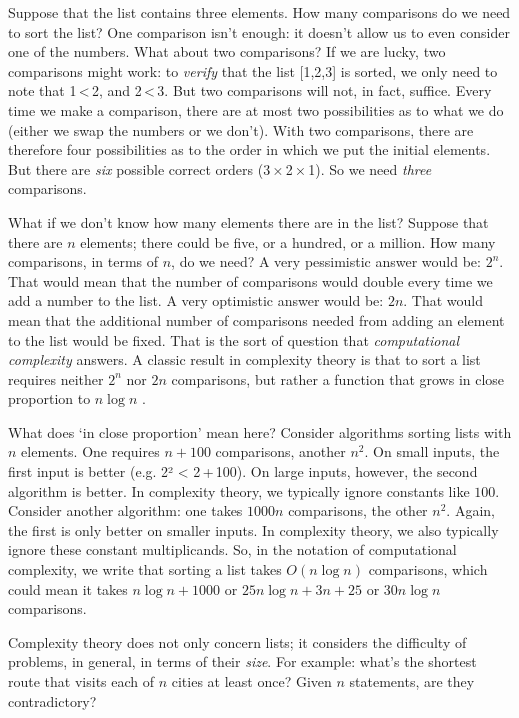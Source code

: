 Suppose that the list contains three elements. How many comparisons do we need to sort the list? One comparison isn’t enough: it doesn’t allow us to even consider one of the numbers. What about two comparisons? If we are lucky, two comparisons might work: to \emph{verify} that the list [1,2,3] is sorted, we only need to note that 1 < 2, and 2 < 3. But two comparisons will not, in fact, suffice. Every time we make a comparison, there are at most two possibilities as to what we do (either we swap the numbers or we don’t). With two comparisons, there are therefore four possibilities as to the order in which we put the initial elements. But there are \emph{six} possible correct orders (3 × 2 × 1). So we need \emph{three} comparisons.

What if we don’t know how many elements there are in the list? Suppose that there are \(n\) elements; there could be five, or a hundred, or a million. How many comparisons, in terms of \(n\), do we need? A very pessimistic answer would be: \(2^n\). That would mean that the number of comparisons would double every time we add a number to the list. A very optimistic answer would be: \(2n\). That would mean that the additional number of comparisons needed from adding an element to the list would be fixed. That is the sort of question that \emph{computational complexity} answers. A classic result in complexity theory is that to sort a list requires neither \(2^n\) nor \(2n\) comparisons, but rather a function that grows in close proportion to \(n \log n\) \parencite{hoare1962}.

What does ‘in close proportion’ mean here? Consider algorithms sorting lists with \(n\) elements. One requires \(n + 100\) comparisons, another \(n^2\). On small inputs, the first input is better (e.g. 2² < 2 + 100). On large inputs, however, the second algorithm is better. In complexity theory, we typically ignore constants like \(100\). Consider another algorithm: one takes \(1000n\) comparisons, the other \(n^2\). Again, the first is only better on smaller inputs. In complexity theory, we also typically ignore these constant multiplicands. So, in the notation of computational complexity, we write that sorting a list takes \(O(n \log n)\) comparisons, which could mean it takes \(n \log n + 1000\) or \(25n \log n + 3n + 25\) or \(30n \log n\) comparisons.

Complexity theory does not only concern lists; it considers the difficulty of problems, in general, in terms of their \emph{size}. For example: what’s the shortest route that visits each of \(n\) cities at least once? Given \(n\) statements, are they contradictory?

